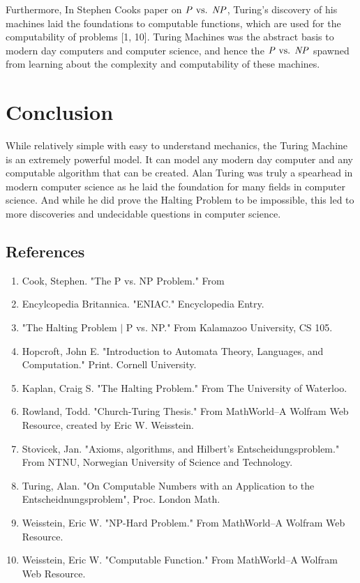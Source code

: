 \documentclass[11pt]{article}
\begin{document}
Furthermore, In Stephen Cooks paper on $\text{\textit{P} vs. \textit{NP}}$, Turing's discovery of his machines laid the foundations to computable functions, which are used for the computability of problems [1, 10]. Turing Machines was the abstract basis to modern day computers and computer science, and hence the $\text{\textit{P} vs. \textit{NP}}$ spawned from learning about the complexity and computability of these machines.

\section{Conclusion}

While relatively simple with easy to understand mechanics, the Turing Machine is an extremely powerful model. It can model any modern day computer and any computable algorithm that can be created. Alan Turing was truly a spearhead in modern computer science as he laid the foundation for many fields in computer science. And while he did prove the Halting Problem to be impossible, this led to more discoveries and undecidable questions in computer science.

\begin{center}
\pagebreak\section*{References}
\end{center}
\begin{enumerate}
\item Cook, Stephen. "The P vs. NP Problem." From 
\item Encylcopedia Britannica. "ENIAC." Encyclopedia Entry.
\item "The Halting Problem $\mid$ P vs. NP." From Kalamazoo University, CS 105.
\item Hopcroft, John E. "Introduction to Automata Theory, Languages, and Computation." Print. Cornell University.
\item Kaplan, Craig S. "The Halting Problem." From The University of Waterloo.
\item Rowland, Todd. "Church-Turing Thesis." From MathWorld--A Wolfram Web Resource, created by Eric W. Weisstein.
\item Stovicek, Jan. "Axioms, algorithms, and Hilbert's Entscheidungsproblem." From NTNU, Norwegian University of Science and Technology.
\item Turing, Alan. "On Computable Numbers with an Application to the Entscheidnungsproblem", Proc. London Math.
\item Weisstein, Eric W. "NP-Hard Problem." From MathWorld--A Wolfram Web Resource.
\item Weisstein, Eric W. "Computable Function." From MathWorld--A Wolfram Web Resource.


\end{enumerate}
\end{document}
